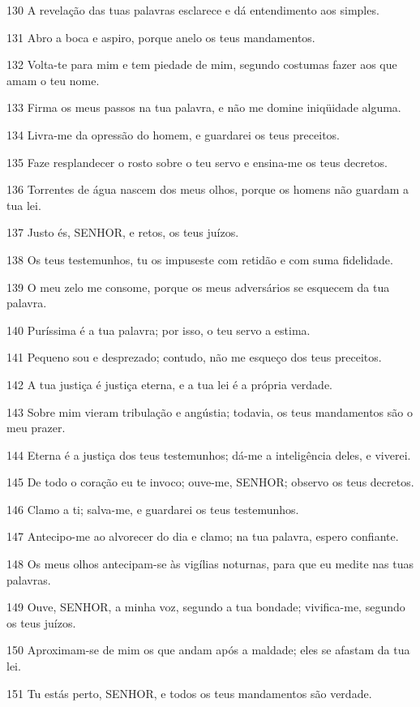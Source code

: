 \par 130 A revelação das tuas palavras esclarece e dá entendimento aos simples.
\par 131 Abro a boca e aspiro, porque anelo os teus mandamentos.
\par 132 Volta-te para mim e tem piedade de mim, segundo costumas fazer aos que amam o teu nome.
\par 133 Firma os meus passos na tua palavra, e não me domine iniqüidade alguma.
\par 134 Livra-me da opressão do homem, e guardarei os teus preceitos.
\par 135 Faze resplandecer o rosto sobre o teu servo e ensina-me os teus decretos.
\par 136 Torrentes de água nascem dos meus olhos, porque os homens não guardam a tua lei.
\par 137 Justo és, SENHOR, e retos, os teus juízos.
\par 138 Os teus testemunhos, tu os impuseste com retidão e com suma fidelidade.
\par 139 O meu zelo me consome, porque os meus adversários se esquecem da tua palavra.
\par 140 Puríssima é a tua palavra; por isso, o teu servo a estima.
\par 141 Pequeno sou e desprezado; contudo, não me esqueço dos teus preceitos.
\par 142 A tua justiça é justiça eterna, e a tua lei é a própria verdade.
\par 143 Sobre mim vieram tribulação e angústia; todavia, os teus mandamentos são o meu prazer.
\par 144 Eterna é a justiça dos teus testemunhos; dá-me a inteligência deles, e viverei.
\par 145 De todo o coração eu te invoco; ouve-me, SENHOR; observo os teus decretos.
\par 146 Clamo a ti; salva-me, e guardarei os teus testemunhos.
\par 147 Antecipo-me ao alvorecer do dia e clamo; na tua palavra, espero confiante.
\par 148 Os meus olhos antecipam-se às vigílias noturnas, para que eu medite nas tuas palavras.
\par 149 Ouve, SENHOR, a minha voz, segundo a tua bondade; vivifica-me, segundo os teus juízos.
\par 150 Aproximam-se de mim os que andam após a maldade; eles se afastam da tua lei.
\par 151 Tu estás perto, SENHOR, e todos os teus mandamentos são verdade.
